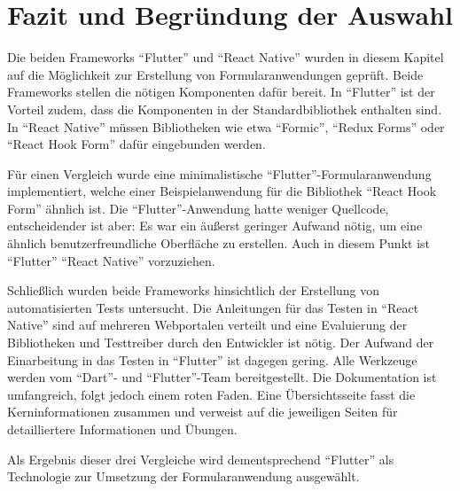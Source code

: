\clearpage
\section{Fazit und Begründung der Auswahl}
\label{sec:Fazit-und-Begründung-der-Auswahl}



Die beiden Frameworks \enquote{Flutter} und \enquote{React Native} wurden in diesem Kapitel auf die Möglichkeit zur Erstellung von Formularanwendungen geprüft.
Beide Frameworks stellen die nötigen Komponenten dafür bereit.
In \enquote{Flutter} ist der Vorteil zudem, dass die Komponenten in der Standardbibliothek enthalten sind.
In \enquote{React Native} müssen Bibliotheken wie etwa \enquote{Formic}, \enquote{Redux Forms} oder \enquote{React Hook Form} dafür eingebunden werden.

Für einen Vergleich wurde eine minimalistische \enquote{Flutter}-Formularanwendung implementiert,
welche einer Beispielanwendung für die Bibliothek \enquote{React Hook Form} ähnlich ist.
Die \enquote{Flutter}-Anwendung hatte weniger Quellcode,
entscheidender ist aber: Es war ein äußerst geringer Aufwand nötig,
um eine ähnlich benutzerfreundliche Oberfläche zu erstellen.
Auch in diesem Punkt ist \enquote{Flutter} \enquote{React Native} vorzuziehen.

Schließlich wurden beide Frameworks hinsichtlich der Erstellung von automatisierten Tests untersucht.
Die Anleitungen für das Testen in \enquote{React Native} sind auf mehreren Webportalen verteilt und eine Evaluierung der Bibliotheken und Testtreiber durch den Entwickler ist nötig.
Der Aufwand der Einarbeitung in das Testen in \enquote{Flutter} ist dagegen  gering.
Alle Werkzeuge werden vom \enquote{Dart}- und \enquote{Flutter}-Team bereitgestellt.
Die Dokumentation ist umfangreich, folgt jedoch einem roten Faden.
Eine Übersichtsseite fasst die Kerninformationen zusammen und verweist auf die jeweiligen  Seiten für detailliertere Informationen und Übungen.

Als Ergebnis dieser drei Vergleiche wird dementsprechend \enquote{Flutter} als Technologie zur Umsetzung der Formularanwendung ausgewählt.

